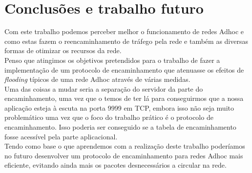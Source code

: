 \documentclass{llncs}
\begin{document}
\section{Conclusões e trabalho futuro}

Com este trabalho podemos perceber melhor o funcionamento de redes Adhoc e como estas fazem o reencaminhamento de tráfego pela rede e também as diversas formas de otimizar os recursos da rede.\\
Penso que atingimos os objetivos pretendidos para o trabalho de fazer a implementação de um protocolo de encaminhamento que atenuasse os efeitos de \emph{flooding} típicos de uma rede Adhoc através de várias medidas.\\
Uma das coisas a mudar seria a separação do servidor da parte do encaminhamento, uma vez que o temos de ter lá para conseguirmos que a nossa aplicação esteja à escuta na porta 9999 em TCP, embora isso não seja muito problemático uma vez que o foco do trabalho prático é o protocolo de encaminhamento. Isso poderia ser conseguido se a tabela de encaminhamento fosse acessível pela parte aplicacional.\\

Tendo como base o que aprendemos com a realização deste trabalho poderíamos no futuro desenvolver um protocolo de encaminhamento para redes Adhoc mais eficiente, evitando ainda mais os pacotes desnecessários a circular na rede.


\clearpage
\end{document}
